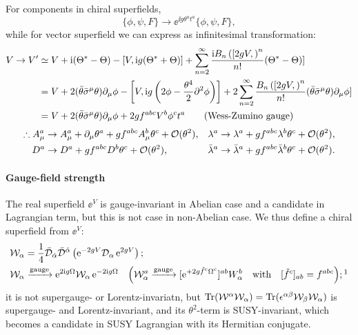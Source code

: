 \documentclass[CheatSheet]{subfiles}
\newcommand{\OD}{{\mathcal D}}
\begin{document}
For components in chiral superfields,
\begin{equation}
   \{\phi,\psi,F\}\to \ee^{\ii g \theta^at^a}\{\phi,\psi,F\},
\end{equation}
while for vector superfield we can express as infinitesimal transformation:
\begin{align}
 V\to V'
&\simeq
V + \mathrm{i} (\Theta^*-\Theta)
 - [V,\mathrm{i} g(\Theta^*+\Theta)]+
 \sum_{n=2}^{\infty}\frac{\mathrm{i} B_n\left([2gV,\right)^n}{n!} (\Theta^*-\Theta)]
\\&=
V +2(\bar\theta\bar\sigma^{\mu}\theta)\partial_{\mu}\phi
 - \left[V,\mathrm{i} g\left(2\phi-\frac{\theta^4}2\partial^2\phi\right)\right]
 +2\sum_{n=2}^{\infty}\frac{B_n\left([2gV,\right)^n}{n!}(\bar\theta\bar\sigma^{\mu}\theta)\partial_{\mu}\phi]
\\&=
V +2(\bar\theta\bar\sigma^{\mu}\theta)\partial_{\mu}\phi
 +2 g f^{abc}V^b\phi^ct^a
\qquad\text{(Wess-Zumino gauge)}
\end{align}
\begin{equation}
\begin{split}
   \therefore A_\mu^a&\to A^a_\mu+\partial_\mu \theta^a
   + g f^{abc}A_\mu^b\theta^c  + \operatorname{\mathcal{O}}(\theta^2),
 &\lambda^a&\to\lambda^a+gf^{abc}\lambda^b\theta^c+\operatorname{\mathcal{O}}(\theta^2),
 \\
 D^a&\to D^a+gf^{abc}D^b\theta^c+\operatorname{\mathcal{O}}(\theta^2),
& \bar\lambda^a&\to\bar\lambda^a+gf^{abc}\bar\lambda^b\theta^c + \operatorname{\mathcal{O}}(\theta^2).
\end{split}
\end{equation}
\paragraph{Gauge-field strength}
The real superfield $\ee^{V}$ is gauge-invariant in Abelian case and a candidate in Lagrangian term, but this is not case in non-Abelian case.
We thus define a chiral superfield from $\ee^{V}$:
\begin{align}
& \mathcal W_\alpha = \frac14\bar\OD_\dalpha\bar\OD^\dalpha\left(\ee^{-2gV}\OD_\alpha\ee^{2gV}\right);\\
&\mathcal W_\alpha\xrightarrow{\text{gauge}}
\ee^{2\ii g \Omega}\mathcal W_{\alpha}\ee^{-2\ii g \Omega}
\quad
\Bigl(
\mathcal W_\alpha^a\xrightarrow{\text{gauge}}[\ee^{+2g \tilde f^c \Omega^c}]^{ab}W_\alpha^b
\text{\quad with\quad$[\tilde f^c]_{ab}=f^{abc}$}
\Bigr);\footnotemark
\end{align}%
%
it is not supergauge- or Lorentz-invariatn, but $\operatorname{\mathrm{Tr}}(\mathcal W^\alpha \mathcal W_\alpha) = \operatorname{\mathrm{Tr}}(\epsilon^{\alpha\beta}\mathcal W_\beta \mathcal W_\alpha)$ is supergauge- and Lorentz-invariant, and its $\theta^2$-term is SUSY-invariant, which becomes a candidate in SUSY Lagrangian with its Hermitian conjugate.
\end{document}
